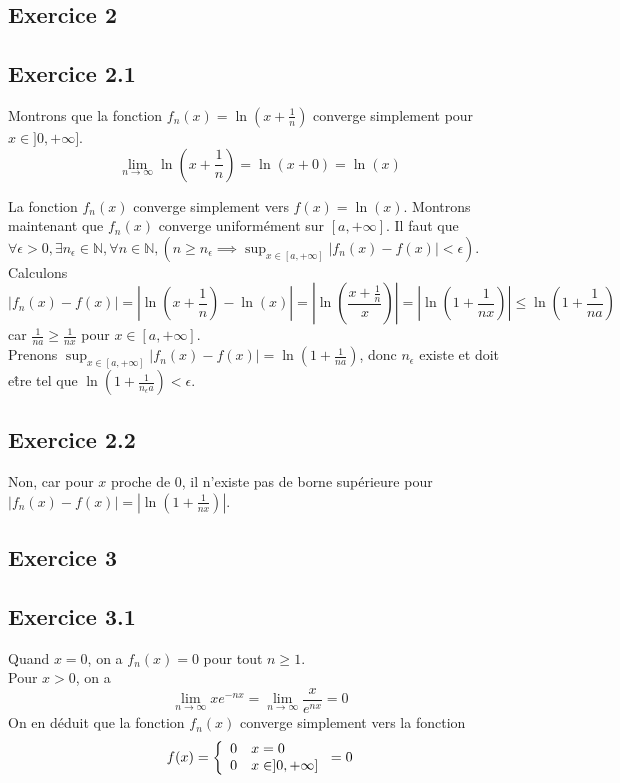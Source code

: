 \documentclass[]{book}
\theoremstyle{definition}
\newcommand{\bb}[1]{\mathbb{#1}}
\newcommand{\N}{\bb{N}}
\begin{document}
\subsection*{Exercice 2}
\subsection*{Exercice 2.1}
Montrons que la fonction $f_n(x)=\ln\left(x+\frac{1}{n}\right)$ converge simplement pour $x \in ]0,+\infty]$.
$$\lim_{n \to \infty}\ln\left(x+\frac{1}{n}\right) = \ln\left(x+0\right) = \ln(x)$$

La fonction $f_n(x)$ converge simplement vers $f(x) = \ln(x)$. Montrons maintenant que $f_n(x)$ converge uniform\'ement sur $[a,+\infty]$. Il faut que $\forall \epsilon > 0, \exists n_{\epsilon} \in \N, \forall n \in \N, (n \geq n_{\epsilon} \implies \sup_{x \in [a,+\infty]} |f_n(x)-f(x)| < \epsilon)$.
Calculons 
$$|f_n(x)-f(x)| = \left|\ln\left(x+\frac{1}{n}\right) - \ln(x)\right| = \left|\ln\left(\frac{x+\frac{1}{n}}{x}\right)\right| = \left|\ln\left(1 + \frac{1}{nx}\right)\right| \leq \ln\left(1 + \frac{1}{na}\right)$$
car $\frac{1}{na} \geq \frac{1}{nx}$ pour $x \in [a,+\infty]$.\\ 
Prenons $\sup_{x \in [a,+\infty]} |f_n(x)-f(x)| = \ln\left(1 + \frac{1}{na}\right)$, donc $n_{\epsilon}$ existe et doit e\^tre tel que $\ln\left(1 + \frac{1}{n_{\epsilon}a}\right) < \epsilon$.

\subsection*{Exercice 2.2}
Non, car pour $x$ proche de 0, il n'existe pas de borne sup\'erieure pour $|f_n(x)-f(x)| = \left|\ln\left(1 + \frac{1}{nx}\right)\right|$.

\subsection*{Exercice 3}
\subsection*{Exercice 3.1}
Quand $x=0$, on a $f_n(x) = 0$ pour tout $n \geq 1$.\\
Pour $x>0$, on a 
$$\lim_{n \to \infty} xe^{-nx} = \lim_{n \to \infty} \frac{x}{e^{nx}} = 0$$
On en d\'eduit que la fonction $f_n(x)$ converge simplement vers la fonction 
$$f(x) = 
\left\{
\begin{array}{l l}
0 & x = 0\\
0 & x \in ]0, +\infty]\\
\end{array}
\right. 
= 0
$$
\end{document}

